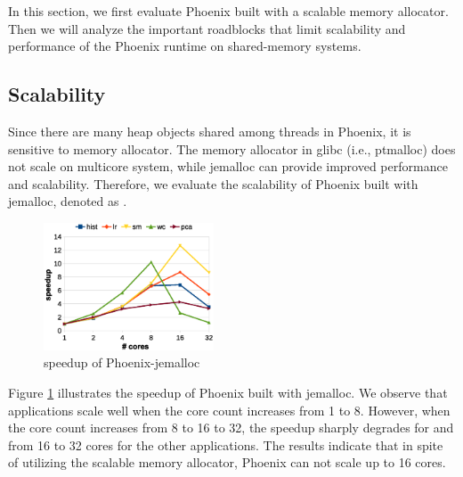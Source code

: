 In this section, we first evaluate Phoenix built with a scalable memory allocator.
Then we will analyze the important roadblocks that limit scalability and performance of the Phoenix runtime on shared-memory systems.



\subsection{Scalability}
Since there are many heap objects shared among threads in Phoenix, it is sensitive to memory allocator\cite{yoo2009phoenix2}.
The memory allocator in glibc (i.e.,  ptmalloc\cite{gloger1997ptmalloc}) does not scale on multicore system, while jemalloc\cite{evans2006jemalloc} can provide improved performance and scalability. 
Therefore, we evaluate the scalability of Phoenix built with jemalloc, denoted as .

\begin{figure}[!h!t]  
	\centering
	\includegraphics[width=0.45\textwidth]{eps/phoenix_speedup_jemalloc.eps}
	\caption{speedup of Phoenix-jemalloc}
	\label{fig:phoenix:speedup:jemalloc}
\end{figure}


Figure \ref{fig:phoenix:speedup:jemalloc} illustrates the speedup of Phoenix built with jemalloc.
We observe that applications scale well when the core count increases from 1 to 8.
However, when the core count increases from 8 to 16 to 32, the speedup sharply degrades for  and from 16 to 32 cores for the other applications.
The results indicate that in spite of utilizing the scalable memory allocator, Phoenix can not scale up to 16 cores.

